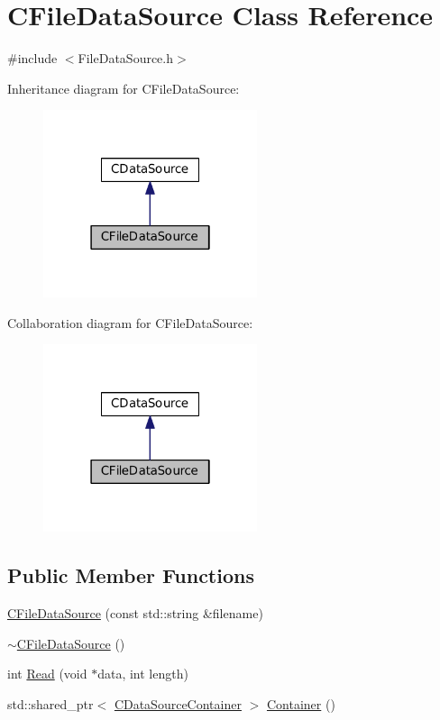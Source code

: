 \hypertarget{classCFileDataSource}{}\section{C\+File\+Data\+Source Class Reference}
\label{classCFileDataSource}


{\ttfamily \#include $<$File\+Data\+Source.\+h$>$}



Inheritance diagram for C\+File\+Data\+Source\+:\nopagebreak
\begin{figure}[H]
\begin{center}
\leavevmode
\includegraphics[width=178pt]{classCFileDataSource__inherit__graph}
\end{center}
\end{figure}


Collaboration diagram for C\+File\+Data\+Source\+:\nopagebreak
\begin{figure}[H]
\begin{center}
\leavevmode
\includegraphics[width=178pt]{classCFileDataSource__coll__graph}
\end{center}
\end{figure}
\subsection*{Public Member Functions}
\begin{DoxyCompactItemize}
\item 
\hyperlink{classCFileDataSource_a785000233dad6de4fe5f5986639642b3}{C\+File\+Data\+Source} (const std\+::string \&filename)
\item 
\hyperlink{classCFileDataSource_a4f2d2cbc2a166ee6afb0c08e5c0edbd4}{$\sim$\+C\+File\+Data\+Source} ()
\item 
int \hyperlink{classCFileDataSource_a97b9c7b8904aecbe7b0e8797508265fd}{Read} (void $\ast$data, int length)
\item 
std\+::shared\+\_\+ptr$<$ \hyperlink{classCDataSourceContainer}{C\+Data\+Source\+Container} $>$ \hyperlink{classCFileDataSource_a2492b88ea8186c4cbd4bdfa92060f5fa}{Container} ()
\end{DoxyCompactItemize}
